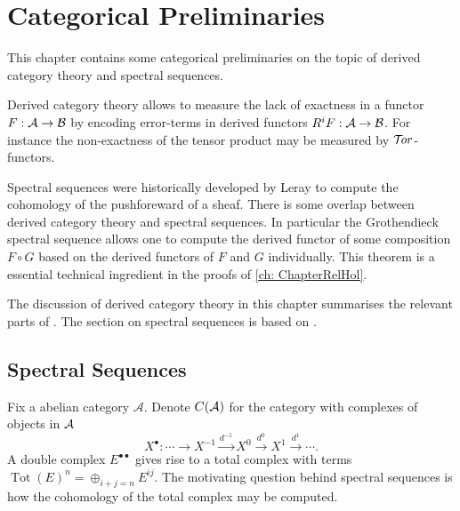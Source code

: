 \chapter{Categorical Preliminaries}\label{ch: ChapterCategory}
This chapter contains some categorical preliminaries on the topic of derived category theory and spectral sequences.

Derived category theory allows to measure the lack of exactness in a functor $F:\AA \to \mathcal{B}$ by encoding error-terms in derived functors $R^iF:\AA \to \mathcal{B}$.
For instance the non-exactness of the tensor product may be measured by $\Tor$-functors.

Spectral sequences were historically developed by Leray to compute the cohomology of the pushforeward of a sheaf.
There is some overlap between derived category theory and spectral sequences.
In particular the Grothendieck spectral sequence allows one to compute the derived functor of some composition $F\circ G$ based on the derived functors of $F$ and $G$ individually.
This theorem is a essential technical ingredient in the proofs of \cref{ch: ChapterRelHol}.

The discussion of derived category theory in this chapter summarises the relevant parts of \cite[Chapters 1, 2 and 5]{dimca2004sheaves}.
The section on spectral sequences is based on \cite{weibel1995introduction}.
\section{Spectral Sequences}
Fix a abelian category $\mathcal{A}$.
Denote $C(\AA)$ for the category with complexes of objects in $\AA$
$$X^\bullet :\cdots \xrightarrow{}  X^{-1}\xrightarrow{d^{-1}} X^0 \xrightarrow{d^{0}} X^1\xrightarrow{d^1} \cdots.$$
A double complex $E^{\bullet \bullet}$ gives rise to a total complex with terms  $\operatorname{Tot}(E)^n = \oplus_{i+j=n} E^{ij}$.
The motivating question behind spectral sequences is how the cohomology of the total complex may be computed.


